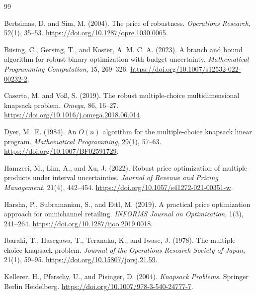 \documentclass[11pt, a4paper]{article}
\theoremstyle{plain}
\theoremstyle{definition}
\theoremstyle{remark}
\begin{document}
\begin{thebibliography}{99}

Bertsimas, D. and Sim, M. (2004).
\newblock The price of robustness.
\newblock \emph{Operations Research}, 52(1), 35--53.
\newblock \url{https://doi.org/10.1287/opre.1030.0065}.

B\"using, C., Gersing, T., and Koster, A. M. C. A. (2023).
\newblock A branch and bound algorithm for robust binary optimization with budget uncertainty.
\newblock \emph{Mathematical Programming Computation}, 15, 269--326.
\newblock \url{https://doi.org/10.1007/s12532-022-00232-2}.

Caserta, M. and Vo{\ss}, S. (2019).
\newblock The robust multiple-choice multidimensional knapsack problem.
\newblock \emph{Omega}, 86, 16--27.
\newblock \url{https://doi.org/10.1016/j.omega.2018.06.014}.

Dyer, M.~E. (1984).
\newblock An $O(n)$ algorithm for the multiple-choice knapsack linear program.
\newblock \emph{Mathematical Programming}, 29(1), 57--63.
\newblock \url{https://doi.org/10.1007/BF02591729}.

Hamzeei, M., Lim, A., and Xu, J. (2022).
\newblock Robust price optimization of multiple products under interval uncertainties.
\newblock \emph{Journal of Revenue and Pricing Management}, 21(4), 442--454.
\newblock \url{https://doi.org/10.1057/s41272-021-00351-w}.

Harsha, P., Subramanian, S., and Ettl, M. (2019).
\newblock A practical price optimization approach for omnichannel retailing.
\newblock \emph{INFORMS Journal on Optimization}, 1(3), 241--264.
\newblock \url{https://doi.org/10.1287/ijoo.2019.0018}.

Ibaraki, T., Hasegawa, T., Teranaka, K., and Iwase, J. (1978).
\newblock The multiple-choice knapsack problem.
\newblock \emph{Journal of the Operations Research Society of Japan}, 21(1), 59--95.
\newblock \url{https://doi.org/10.15807/jorsj.21.59}.

Kellerer, H., Pferschy, U., and Pisinger, D. (2004).
\newblock \emph{Knapsack Problems}.
\newblock Springer Berlin Heidelberg.
\newblock \url{https://doi.org/10.1007/978-3-540-24777-7}.


\end{thebibliography}
\end{document}
